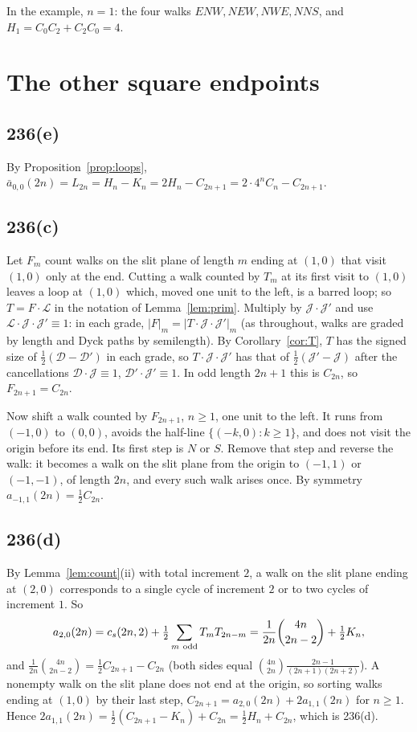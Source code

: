 \documentclass[11pt]{amsart}
\theoremstyle{definition}
\theoremstyle{remark}
\newcommand{\abar}{\bar a}
\begin{document}
In the example, $n=1$: the four walks $ENW,NEW,NWE,NNS$, and $H_1=C_0C_2+C_2C_0=4$.

\section{The other square endpoints}\label{sec:square}

\subsection*{236(e)} By Proposition~\ref{prop:loops}, $\abar_{0,0}(2n)=L_{2n}=H_n-K_n=2H_n-C_{2n+1}=2\cdot4^nC_n-C_{2n+1}$.

\subsection*{236(c)} Let $F_m$ count walks on the slit plane of length $m$ ending at $(1,0)$ that visit $(1,0)$ only at
the end. Cutting a walk counted by $T_m$ at its first visit to $(1,0)$ leaves a loop at $(1,0)$ which, moved one unit
to the left, is a barred loop; so $T=F\cdot\mathcal L$ in the notation of Lemma~\ref{lem:prim}. Multiply by
$\mathcal J\cdot\mathcal J'$ and use $\mathcal L\cdot\mathcal J\cdot\mathcal J'\equiv1$: in each grade,
$|F|_m=|T\cdot\mathcal J\cdot\mathcal J'|_m$ (as throughout, walks are graded by length and Dyck paths by semilength). By Corollary~\ref{cor:T}, $T$ has the signed size of
$\frac12(\mathcal D-\mathcal D')$ in each grade, so $T\cdot\mathcal J\cdot\mathcal J'$ has that of
$\frac12(\mathcal J'-\mathcal J)$ after the cancellations $\mathcal D\cdot\mathcal J\equiv1$,
$\mathcal D'\cdot\mathcal J'\equiv1$. In odd length $2n+1$ this is $C_{2n}$, so $F_{2n+1}=C_{2n}$.

Now shift a walk counted by $F_{2n+1}$, $n\ge1$, one unit to the left. It runs from $(-1,0)$ to $(0,0)$, avoids the
half-line $\{(-k,0):k\ge1\}$, and does not visit the origin before its end. Its first step is $N$ or $S$. Remove that
step and reverse the walk: it becomes a walk on the slit plane from the origin to $(-1,1)$ or $(-1,-1)$, of length
$2n$, and every such walk arises once. By symmetry $a_{-1,1}(2n)=\frac12C_{2n}$.

\subsection*{236(d)} By Lemma~\ref{lem:count}(ii) with total increment $2$, a walk on the slit plane ending at $(2,0)$
corresponds to a single cycle of increment $2$ or to two cycles of increment $1$. So
\[
  a_{2,0}(2n)=c_s(2n,2)+\tfrac12\sum_{m\ \rm odd}T_mT_{2n-m}=\frac{1}{2n}\binom{4n}{2n-2}+\tfrac12K_n,
\]
and $\frac1{2n}\binom{4n}{2n-2}=\frac12C_{2n+1}-C_{2n}$ (both sides equal $\binom{4n}{2n}\frac{2n-1}{(2n+1)(2n+2)}$).
A nonempty walk on the slit plane does not end at the origin, so sorting walks ending at $(1,0)$ by their last step,
$C_{2n+1}=a_{2,0}(2n)+2a_{1,1}(2n)$ for $n\ge1$. Hence
$2a_{1,1}(2n)=\frac12(C_{2n+1}-K_n)+C_{2n}=\frac12H_n+C_{2n}$, which is 236(d).
\end{document}
